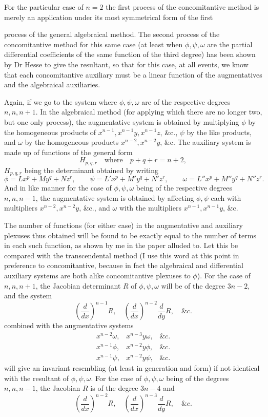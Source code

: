 \documentclass[11pt]{article}
\newcommand{\sourcepage}[1]{\marginpar{\scriptsize p.~#1}}
\begin{document}
{{For the particular case of $n=2$ the first process of the concomitantive method is merely an application under its most symmetrical form of the first

\sourcepage{301}
process of the general algebraical method. The second process of the concomitantive method for this same case (at least when $\phi,\psi,\omega$ are the partial differential coefficients of the same function of the third degree) has been shown by Dr Hesse to give the resultant, so that for this case, at all events, we know that each concomitantive auxiliary must be a linear function of the augmentatives and the algebraical auxiliaries.

Again, if we go to the system where $\phi,\psi,\omega$ are of the respective degrees $n,n,n+1$. In the algebraical method (for applying which there are no longer two, but one only process), the augmentative system is obtained by multiplying $\phi$ by the homogeneous products of $x^{n-1},x^{n-1}y,x^{n-1}z$, \&c., $\psi$ by the like products, and $\omega$ by the homogeneous products $x^{n-2},x^{n-2}y$, \&c. The auxiliary system is made up of functions of the general form
\[
H_{p,q,r}\quad\text{where}\quad p+q+r=n+2,
\]
$H_{p,q,r}$ being the determinant obtained by writing
\[
\phi=Lx^p+My^q+Nz^r,
\qquad
\psi=L'x^p+M'y^q+N'z^r,
\qquad
\omega=L''x^p+M''y^q+N''z^r.
\]
And in like manner for the case of $\phi,\psi,\omega$ being of the respective degrees $n,n,n-1$, the augmentative system is obtained by affecting $\phi,\psi$ each with multipliers $x^{n-2},x^{n-2}y$, \&c., and $\omega$ with the multipliers $x^{n-1},x^{n-1}y$, \&c.

The number of functions (for either case) in the augmentative and auxiliary plexuses thus obtained will be found to be exactly equal to the number of terms in each such function, as shown by me in the paper alluded to. Let this be compared with the transcendental method (I use this word at this point in preference to concomitantive, because in fact the algebraical and differential auxiliary systems are both alike concomitantive plexuses to $\phi$). For the case of $n,n,n+1$, the Jacobian determinant $R$ of $\phi,\psi,\omega$ will be of the degree $3n-2$, and the system
\[
\left(\frac{d}{dx}\right)^{n-1}R,
\quad
\left(\frac{d}{dx}\right)^{n-2}\frac{d}{dy}R,
\quad \&c.
\]
combined with the augmentative systems
\[
\begin{array}{ccc}
x^{n-2}\omega,&x^{n-3}y\omega,&\&c.\\
x^{n-1}\phi,&x^{n-2}y\phi,&\&c.\\
x^{n-1}\psi,&x^{n-2}y\psi,&\&c.
\end{array}
\]
will give an invariant resembling (at least in generation and form) if not identical with the resultant of $\phi,\psi,\omega$. For the case of $\phi,\psi,\omega$ being of the degrees $n,n,n-1$, the Jacobian $R$ is of the degree $3n-4$ and
\[
\left(\frac{d}{dx}\right)^{n-2}R,
\quad
\left(\frac{d}{dx}\right)^{n-3}\frac{d}{dy}R,
\quad \&c.
\]

}}
\end{document}
